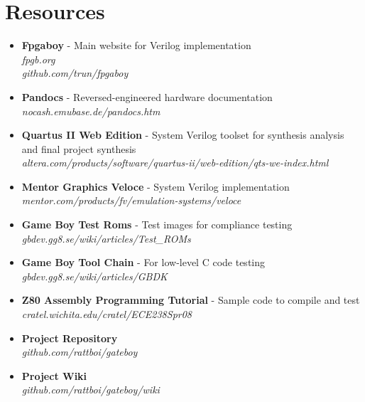 \section{Resources}
\begin{itemize}
    \item {\bf Fpgaboy}
            - Main website for Verilog implementation\\
            {\it fpgb.org} \\
            {\it github.com/trun/fpgaboy}
    \item {\bf Pandocs} - Reversed-engineered hardware documentation\\ 
            {\it nocash.emubase.de/pandocs.htm}
    \item {\bf Quartus II Web Edition} - System Verilog toolset 
             for synthesis analysis and final project synthesis\\
            {\it altera.com/products/software/quartus-ii/web-edition/qts-we-index.html}
    \item {\bf Mentor Graphics Veloce} - System Verilog implementation\\
            {\it mentor.com/products/fv/emulation-systems/veloce}
    \item {\bf Game Boy Test Roms}     - Test images for compliance testing\\
            {\it gbdev.gg8.se/wiki/articles/Test\_ROMs}
    \item {\bf Game Boy Tool Chain} - For low-level C code testing\\
            {\it gbdev.gg8.se/wiki/articles/GBDK}
    \item {\bf Z80 Assembly Programming Tutorial} - Sample code to compile and test\\
            {\it cratel.wichita.edu/cratel/ECE238Spr08}
    \item {\bf Project Repository}\\
            {\it github.com/rattboi/gateboy}
    \item {\bf Project Wiki}\\
            {\it github.com/rattboi/gateboy/wiki}
\end{itemize}

